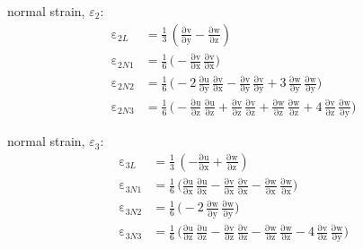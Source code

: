 normal strain, $\varepsilon_2$:
\begin{subequations}
    \begin{align}
    \mathrm \varepsilon_{2L} & = \frac{1}{3} \, \left(\mathrm{\frac{\partial v}{\partial y}} - \mathrm{\frac{\partial w}{\partial z}}\right)\\
    \mathrm \varepsilon_{2N1} & = \frac{1}{6} \, \Big(- \mathrm{\frac{\partial v}{\partial x}}\, \mathrm{\frac{\partial v}{\partial x}}\Big)\\
    \mathrm \varepsilon_{2N2} & = \frac{1}{6} \, \Big( - 2 \, \mathrm{\frac{\partial u}{\partial y}}\, \mathrm{\frac{\partial v}{\partial x}} - \mathrm{\frac{ \partial v}{\partial y}}\, \mathrm{\frac{ \partial v}{\partial y}}+ 3 \,  \mathrm{\frac{\partial w}{\partial y}}\, \mathrm{\frac{\partial w}{\partial y}}\Big)\\
    \mathrm \varepsilon_{2N3} & = \frac{1}{6} \, \Big(	 - \mathrm{\frac{\partial u}{\partial z}}\, \mathrm{\frac{\partial u}{\partial z}} + \mathrm{\frac{\partial v}{\partial z}}\, \mathrm{\frac{\partial v}{\partial z}}  +  \mathrm{\frac{\partial w}{\partial z}}\, \mathrm{\frac{\partial w}{\partial z}} + 4 \, \mathrm{\frac{\partial v}{\partial z}}\, \mathrm{\frac{\partial w}{\partial y}}\Big)
    \end{align}
\end{subequations}

normal strain, $\varepsilon_3$:
\begin{subequations}
    \begin{align}
    \mathrm \varepsilon_{3L} & = \frac{1}{3} \, \left(-\mathrm{\frac{\partial u}{\partial x}} + \mathrm{\frac{\partial w}{\partial z}}\right)\\
    \mathrm \varepsilon_{3N1} & = \frac{1}{6} \, \Big(\mathrm{\frac{ \partial u}{\partial x}}\, \mathrm{\frac{ \partial u}{\partial x}}	- \mathrm{\frac{\partial v}{\partial x}}\, \mathrm{\frac{\partial v}{\partial x}}- \mathrm{\frac{\partial w}{\partial x}}\, \mathrm{\frac{\partial w}{\partial x}}\Big)\\
    \mathrm \varepsilon_{3N2} & = \frac{1}{6} \, \Big( - 2 \,  \mathrm{\frac{\partial w}{\partial y}}\, \mathrm{\frac{\partial w}{\partial y}}\Big)\\
    \mathrm \varepsilon_{3N3} & = \frac{1}{6} \, \Big(\mathrm{\frac{\partial u}{\partial z}}\, \mathrm{\frac{\partial u}{\partial z}} - \mathrm{\frac{\partial v}{\partial z}}\, \mathrm{\frac{\partial v}{\partial z}} -  \mathrm{\frac{\partial w}{\partial z}}\, \mathrm{\frac{\partial w}{\partial z}} - 4 \, \mathrm{\frac{\partial v}{\partial z}}\, \mathrm{\frac{\partial w}{\partial y}}\Big)
    \end{align}
\end{subequations}

